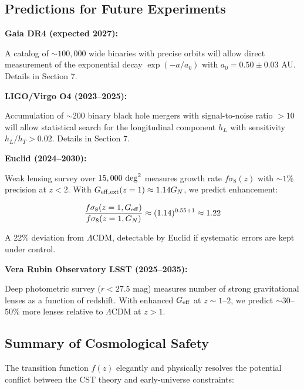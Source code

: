 \documentclass[11pt,a4paper]{article}
\begin{document}
\hypertarget{predictions-for-future-experiments}{%
\subsection{Predictions for Future
Experiments}\label{predictions-for-future-experiments}}

\textbf{Gaia DR4 (expected 2027):}

A catalog of \(\sim 100,000\) wide binaries with precise orbits will
allow direct measurement of the exponential decay \(\exp(-a/a_0)\) with
\(a_0 = 0.50 \pm 0.03\) AU. Details in Section 7.

\textbf{LIGO/Virgo O4 (2023--2025):}

Accumulation of \(\sim 200\) binary black hole mergers with
signal-to-noise ratio \(>10\) will allow statistical search for the
longitudinal component \(h_L\) with sensitivity \(h_L/h_T > 0.02\).
Details in Section 7.

\textbf{Euclid (2024--2030):}

Weak lensing survey over \(15,000~{\rm deg}^2\) measures growth rate
\(f\sigma_8(z)\) with \(\sim 1\%\) precision at \(z < 2\). With
\(G_{\rm eff,ext}(z=1) \approx 1.14 G_N\), we predict enhancement:

\[\frac{f\sigma_8(z=1, G_{\rm eff})}{f\sigma_8(z=1, G_N)} \approx (1.14)^{0.55+1} \approx 1.22\]

A 22\% deviation from \(\Lambda\)CDM, detectable by Euclid if systematic
errors are kept under control.

\textbf{Vera Rubin Observatory LSST (2025--2035):}

Deep photometric survey (\(r < 27.5\) mag) measures number of strong
gravitational lenses as a function of redshift. With enhanced
\(G_{\rm eff}\) at \(z \sim 1\)--2, we predict \(\sim 30\)--50\% more
lenses relative to \(\Lambda\)CDM at \(z > 1\).

\hypertarget{summary-of-cosmological-safety}{%
\subsection{Summary of Cosmological
Safety}\label{summary-of-cosmological-safety}}

The transition function \(f(z)\) elegantly and physically resolves the
potential conflict between the CST theory and early-universe
constraints:
\end{document}
